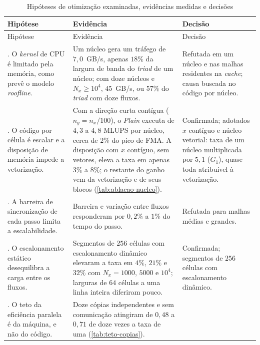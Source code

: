 \begingroup
\SingleSpacing
\footnotesize
\setlength{\tabcolsep}{4pt}
\begin{longtable}{>{\raggedright\arraybackslash}p{3.2cm}>{\raggedright\arraybackslash}p{7.6cm}>{\raggedright\arraybackslash}p{4.3cm}}
    \caption{Hipóteses de otimização examinadas, evidências medidas e decisões}\label{tab:hipoteses-otimizacao} \\
    \toprule
    Hipótese & Evidência & Decisão \\
    \midrule
    \endfirsthead
    \toprule
    Hipótese & Evidência & Decisão \\
    \midrule
    \endhead
    \bottomrule
    \endlastfoot
    1. O \textit{kernel} de CPU é limitado pela memória, como prevê o modelo \textit{roofline}. &
        Um núcleo gera um tráfego de $7{,}0$~GB/s, apenas $18\%$ da largura de banda do \textit{triad} de um núcleo; com doze núcleos e $N_x \geq 10^4$, $45$~GB/s, ou $57\%$ do \textit{triad} com doze fluxos. &
        Refutada em um núcleo e nas malhas residentes na \textit{cache}; causa buscada no código por núcleo. \\
    2. O código por célula é escalar e a disposição de memória impede a vetorização. &
        Com a direção curta contígua ($n_y = n_x/100$), o \textit{Plain} executa de $4{,}3$ a $4{,}8$ MLUPS por núcleo, cerca de $2\%$ do pico de FMA. A disposição com $x$ contíguo, sem vetores, eleva a taxa em apenas $3\%$ a $8\%$; o restante do ganho vem da vetorização e de seus blocos (\autoref{tab:ablacao-nucleo}). &
        Confirmada; adotados $x$ contíguo e núcleo vetorial: taxa de um núcleo multiplicada por $5{,}1$ ($G_1$), quase toda atribuível à vetorização. \\
    3. A barreira de sincronização de cada passo limita a escalabilidade. &
        Barreira e variação entre fluxos responderam por $0{,}2\%$ a $1\%$ do tempo do passo. &
        Refutada para malhas médias e grandes. \\
    4. O escalonamento estático desequilibra a carga entre os fluxos. &
        Segmentos de $256$ células com escalonamento dinâmico elevaram a taxa em $4\%$, $21\%$ e $32\%$ com $N_x = 1000$, $5000$ e $10^4$; larguras de $64$ células a uma linha inteira diferiram pouco. &
        Confirmada; segmentos de $256$ células com escalonamento dinâmico. \\
    5. O teto da eficiência paralela é da máquina, e não do código. &
        Doze cópias independentes e sem comunicação atingiram de $0{,}48$ a $0{,}71$ de doze vezes a taxa de uma (\autoref{tab:teto-copias}). &

\end{longtable}
